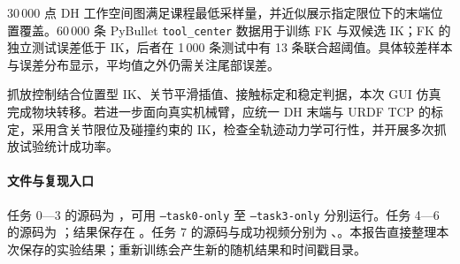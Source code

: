 \documentclass[12pt,a4paper,UTF8]{ctexart}
\begin{document}
30\,000 点 DH 工作空间图满足课程最低采样量，并近似展示指定限位下的末端位置覆盖。60\,000 条 PyBullet \texttt{tool\_center} 数据用于训练 FK 与双候选 IK；FK 的独立测试误差低于 IK，后者在 1\,000 条测试中有 13 条联合超阈值。具体较差样本与误差分布显示，平均值之外仍需关注尾部误差。

抓放控制结合位置型 IK、关节平滑插值、接触标定和稳定判据，本次 GUI 仿真完成物块转移。若进一步面向真实机械臂，应统一 DH 末端与 URDF TCP 的标定，采用含关节限位及碰撞约束的 IK，检查全轨迹动力学可行性，并开展多次抓放试验统计成功率。

\paragraph{文件与复现入口}
任务 0—3 的源码为 ，可用 \texttt{--task0-only} 至 \texttt{--task3-only} 分别运行。任务 4—6 的源码为 ；结果保存在 。任务 7 的源码与成功视频分别为 、。本报告直接整理本次保存的实验结果；重新训练会产生新的随机结果和时间戳目录。
\end{document}
